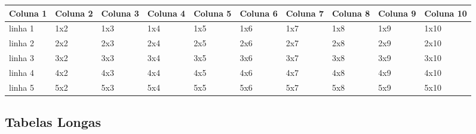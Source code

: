 \documentclass[
  12pt,		%
  a4paper,	%
  openright,%
  oneside,	%
  chapter=TITLE,		%
  section=TITLE,		%
  english,	%
  french,	%
  spanish,	%
  brazil
]{abntex2}
\begin{document}
             
             \begin{landscape}
                \begin{table}
                {
                \begin{tabular}{llllllllll}
                        \toprule
                        \textbf{Coluna 1} & \textbf{Coluna 2} & \textbf{Coluna 3} & \textbf{Coluna 4} & \textbf{Coluna 5} & \textbf{Coluna 6} & \textbf{Coluna 7} & \textbf{Coluna 8} & \textbf{Coluna 9} & \textbf{Coluna 10} \\
                        \midrule
                        linha 1 & 1x2 & 1x3 & 1x4 & 1x5 & 1x6 & 1x7 & 1x8 & 1x9 & 1x10 \\
                        linha 2 & 2x2 & 2x3 & 2x4 & 2x5 & 2x6 & 2x7 & 2x8 & 2x9 & 2x10 \\
                        linha 3 & 3x2 & 3x3 & 3x4 & 3x5 & 3x6 & 3x7 & 3x8 & 3x9 & 3x10 \\
                        linha 4 & 4x2 & 4x3 & 4x4 & 4x5 & 4x6 & 4x7 & 4x8 & 4x9 & 4x10 \\
                        linha 5 & 5x2 & 5x3 & 5x4 & 5x5 & 5x6 & 5x7 & 5x8 & 5x9 & 5x10 \\
                        \bottomrule
                    
                    \end{tabular}
                    }
                    {
                    }
                
                \end{table}
            \end{landscape}
             
                
             \subsection {Tabelas Longas}
             \label{chapter:exemplos:tabelas_longas}
             
\end{document}
